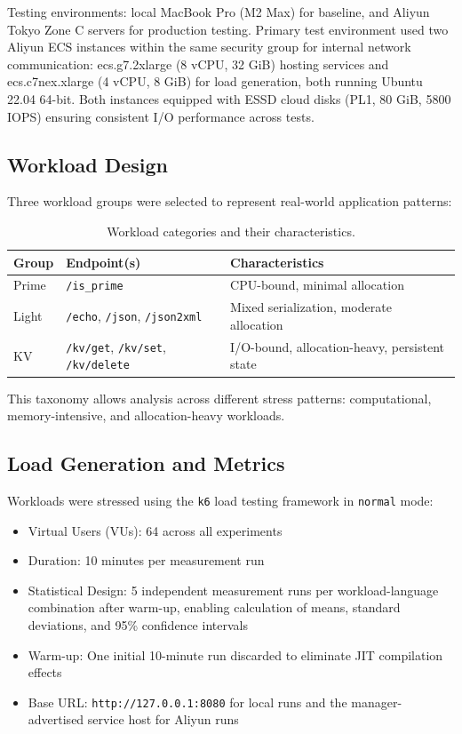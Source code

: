 \documentclass{article}
\begin{document}
Testing environments: local MacBook Pro (M2 Max) for baseline, and Aliyun Tokyo Zone C servers for production testing. Primary test environment used two Aliyun ECS instances within the same security group for internal network communication: ecs.g7.2xlarge (8 vCPU, 32 GiB) hosting services and ecs.c7nex.xlarge (4 vCPU, 8 GiB) for load generation, both running Ubuntu 22.04 64-bit. Both instances equipped with ESSD cloud disks (PL1, 80 GiB, 5800 IOPS) ensuring consistent I/O performance across tests.

\subsection{Workload Design}

Three workload groups were selected to represent real-world application patterns:

\begin{table}[h]
  \centering
  \begin{tabular}{@{}lll@{}}
  \toprule
  Group & Endpoint(s) & Characteristics \\
  \midrule
  Prime & \texttt{/is\_prime} & CPU-bound, minimal allocation \\
  Light & \texttt{/echo}, \texttt{/json}, \texttt{/json2xml} & Mixed serialization, moderate allocation \\
  KV & \texttt{/kv/get}, \texttt{/kv/set}, \texttt{/kv/delete} & I/O-bound, allocation-heavy, persistent state \\
  \bottomrule
  \end{tabular}
  \caption{Workload categories and their characteristics.}
  \label{tab:workloads}
\end{table}

This taxonomy allows analysis across different stress patterns: computational, memory-intensive, and allocation-heavy workloads.

\subsection{Load Generation and Metrics}

Workloads were stressed using the \texttt{k6} load testing framework in \texttt{normal} mode:

\begin{itemize}
    \item Virtual Users (VUs): 64 across all experiments
    \item Duration: 10 minutes per measurement run
    \item Statistical Design: 5 independent measurement runs per workload-language combination after warm-up, enabling calculation of means, standard deviations, and 95\% confidence intervals
    \item Warm-up: One initial 10-minute run discarded to eliminate JIT compilation effects
    \item Base URL: \texttt{http://127.0.0.1:8080} for local runs and the manager-advertised service host for Aliyun runs
\end{itemize}
\end{document}
